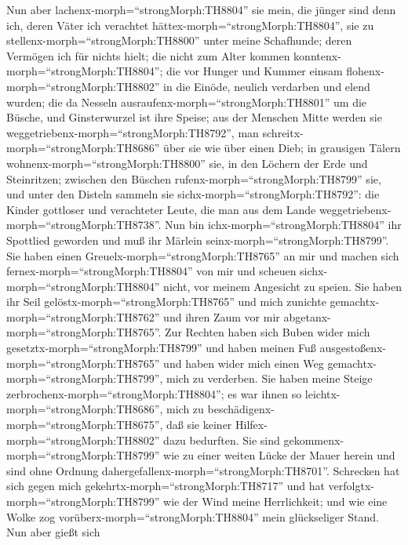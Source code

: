  Nun aber lachenx-morph=``strongMorph:TH8804'' sie mein, die
jünger sind denn ich, deren Väter ich verachtet
hättex-morph=``strongMorph:TH8804'', sie zu
stellenx-morph=``strongMorph:TH8800'' unter meine Schafhunde;
 deren Vermögen ich für nichts hielt; die nicht zum Alter
kommen konntenx-morph=``strongMorph:TH8804'';  die vor
Hunger und Kummer einsam flohenx-morph=``strongMorph:TH8802'' in die
Einöde, neulich verdarben und elend wurden;  die da Nesseln
ausraufenx-morph=``strongMorph:TH8801'' um die Büsche, und Ginsterwurzel
ist ihre Speise;  aus der Menschen Mitte werden sie
weggetriebenx-morph=``strongMorph:TH8792'', man
schreitx-morph=``strongMorph:TH8686'' über sie wie über einen Dieb;
 in grausigen Tälern wohnenx-morph=``strongMorph:TH8800''
sie, in den Löchern der Erde und Steinritzen;  zwischen den
Büschen rufenx-morph=``strongMorph:TH8799'' sie, und unter den Disteln
sammeln sie sichx-morph=``strongMorph:TH8792'':  die Kinder
gottloser und verachteter Leute, die man aus dem Lande
weggetriebenx-morph=``strongMorph:TH8738''.  Nun bin
ichx-morph=``strongMorph:TH8804'' ihr Spottlied geworden und muß ihr
Märlein seinx-morph=``strongMorph:TH8799''.  Sie haben
einen Greuelx-morph=``strongMorph:TH8765'' an mir und machen sich
fernex-morph=``strongMorph:TH8804'' von mir und scheuen
sichx-morph=``strongMorph:TH8804'' nicht, vor meinem Angesicht zu
speien.  Sie haben ihr Seil
gelöstx-morph=``strongMorph:TH8765'' und mich zunichte
gemachtx-morph=``strongMorph:TH8762'' und ihren Zaum vor mir
abgetanx-morph=``strongMorph:TH8765''.  Zur Rechten haben
sich Buben wider mich gesetztx-morph=``strongMorph:TH8799'' und haben
meinen Fuß ausgestoßenx-morph=``strongMorph:TH8765'' und haben wider
mich einen Weg gemachtx-morph=``strongMorph:TH8799'', mich zu verderben.
 Sie haben meine Steige
zerbrochenx-morph=``strongMorph:TH8804''; es war ihnen so
leichtx-morph=``strongMorph:TH8686'', mich zu
beschädigenx-morph=``strongMorph:TH8675'', daß sie keiner
Hilfex-morph=``strongMorph:TH8802'' dazu bedurften.  Sie
sind gekommenx-morph=``strongMorph:TH8799'' wie zu einer weiten Lücke
der Mauer herein und sind ohne Ordnung
dahergefallenx-morph=``strongMorph:TH8701''.  Schrecken hat
sich gegen mich gekehrtx-morph=``strongMorph:TH8717'' und hat
verfolgtx-morph=``strongMorph:TH8799'' wie der Wind meine Herrlichkeit;
und wie eine Wolke zog vorüberx-morph=``strongMorph:TH8804'' mein
glückseliger Stand.  Nun aber gießt sich
